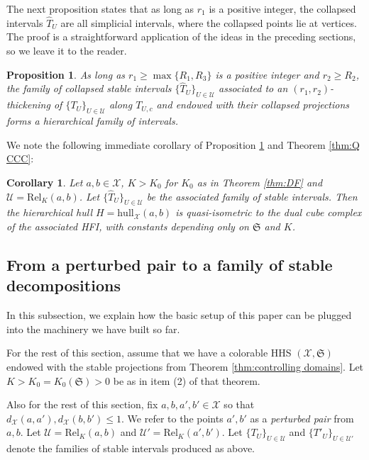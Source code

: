\documentclass{amsart}
\newtheorem{proposition}[theorem]{Proposition}
\newtheorem{corollary}[theorem]{Corollary}
\theoremstyle{definition}
\theoremstyle{remark}
\theoremstyle{definition}
\newcommand{\calU}{\mathcal{U}}
\newcommand{\calX}{\mathcal{X}}
\newcommand{\hT}{\widehat{T}}
\newcommand{\Rel}{\mathrm{Rel}}
\newcommand{\hull}{\mathrm{hull}}
\begin{document}
The next proposition states that as long as $r_1$ is a positive integer, the collapsed intervals $\hT_U$ are all simplicial intervals, where the collapsed points lie at vertices.  The proof is a straightforward application of the ideas in the preceding sections, so we leave it to the reader.

\begin{proposition}\label{prop:stable HFI}
As long as $r_1\geq \max\{R_1,R_3\}$ is a positive integer and $r_2\geq R_2$, the family of collapsed stable intervals $\{\hT_U\}_{U \in \calU}$ associated to an $(r_1,r_2)$-thickening of $\{T_U\}_{U \in \calU}$ along $T_{U,c}$ and endowed with their collapsed projections forms a hierarchical family of intervals.
\end{proposition} 



We note the following immediate corollary of Proposition \ref{prop:stable HFI} and Theorem \ref{thm:Q CCC}:

\begin{corollary}\label{cor:stable HFI cube}
Let $a,b \in \calX$, $K > K_0$ for $K_0$ as in Theorem \ref{thm:DF} and $\calU = \Rel_K(a,b)$.  Let $\{\hT_U\}_{U \in \calU}$ be the associated family of stable intervals.  Then the hierarchical hull $H = \hull_{\calX}(a,b)$ is quasi-isometric to the dual cube complex of the associated HFI, with constants depending only on $\mathfrak S$ and $K$.
\end{corollary}





\subsection{From a perturbed pair to a family of stable decompositions} \label{subsec:perturbed to stable}

In this subsection, we explain how the basic setup of this paper can be plugged into the machinery we have built so far.

For the rest of this section, assume that we have a colorable HHS $(\calX, \mathfrak S)$ endowed with the stable projections from Theorem \ref{thm:controlling domains}.  Let $K > K_0=K_0(\mathfrak S)>0$ be as in item (2) of that theorem.  



Also for the rest of this section, fix $a,b,a',b' \in \calX$ so that $d_{\calX}(a,a'), d_{\calX}(b,b') \leq 1$.  We refer to the points $a',b'$ as a \emph{perturbed pair} from $a,b$.  Let $\calU = \Rel_{K}(a,b)$ and $\calU' = \Rel_{K}(a',b')$.  Let $\{T_U\}_{U \in \calU}$ and $\{T'_U\}_{U \in \calU'}$ denote the families of stable intervals produced as above. 
\end{document}
